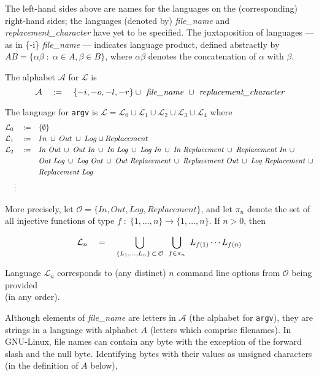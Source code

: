 \documentclass[12pt]{article}
\newcommand{\tab}{\hspace*{2em}}
\newcommand{\mtab}{\hspace*{1em}}
\newcommand{\es}[1] {\begin{equation*}#1\end{equation*}}
\newcommand{\as}[1] {\begin{align*}#1\end{align*}}
\newcommand{\ra}{\rightarrow}
\newcommand{\cdef}{\mtab:=\mtab}
\begin{document}
The left-hand sides above are names for the languages on the (corresponding) right-hand sides; the languages 
(denoted by) \textit{file\_name} and \textit{replacement\_character} have yet to be specified. The juxtaposition
of languages --- as in \{-i\} \textit{file\_name} --- indicates language product, defined abstractly by \\
$ AB = \{\alpha\beta \;:\; \alpha \in A, \beta \in B\} $, where $ \alpha \beta $ 
denotes the concatenation of $ \alpha $ with $ \beta $.

The alphabet $ \mathcal{A} $ for $ \mathcal{L} $ is
\es{ 
    \mathcal{A} \mtab:=\mtab \{-i, -o, -l, -r\} \cup \textit{ file\_name } \cup \textit{ replacement\_character} 
}

The language for \texttt{argv} is 
    $ \mathcal{L} = \mathcal{L}_0 \cup \mathcal{L}_1 \cup \mathcal{L}_2 \cup \mathcal{L}_3 \cup \mathcal{L}_4 $ 
where
\as{
    \mathcal{L}_0 \cdef &\{ \emptyset \} \\
    \mathcal{L}_1 \cdef &In \;\cup\; Out \;\cup\; Log \cup Replacement \\
    \mathcal{L}_2 \cdef &\textit{In Out} \;\cup\; \textit{Out In} \;\cup\; \textit{In Log} \;\cup\; \textit{Log In} \;\cup\; 
                            \textit{In Replacement} \;\cup\; \textit{Replacement In} \;\,\cup \\ 
                        &\textit{Out Log} \;\cup\; \textit{Log Out} \;\cup\; \textit{Out Replacement} \;\cup\; 
                            \textit{Replacement Out} \;\cup\; \textit{Log Replacement} \;\,\cup \\ 
                        &\textit{Replacement Log} \\
    \vdots \tab\mtab&
}

More precisely, let 
    $ \mathcal{O} = \{\textit{In}, \textit{Out}, \textit{Log}, \textit{Replacement}\} $, 
and let $ \pi_n $ denote the set of all injective functions of type 
    $ f \;:\; \{1, \dotsc, n\} \ra \{1, \dotsc, n\} $. If $ n > 0 $, then

\es{
    \mathcal{L}_n \mtab=\mtab 
        \underset{\{ L_1, \dots, L_n\} \,\subset\, \mathcal{O}}{\bigcup} \; \;
        \underset{f \in \pi_n}{\bigcup} \;\; L_{f(1)} \dotsm L_{f(n)} 
}

Language $ \mathcal{L}_n $ corresponds to (any distinct) $ n $ command line options from $ \mathcal{O} $ being provided \\ 
(in any order). \bigskip


Although elements of \textit{file\_name} are letters in $ \mathcal{A} $ (the alphabet for \texttt{argv}), they are 
strings in a language with alphabet $ A $ (letters which comprise filenames). In GNU-Linux, file names can contain 
any byte with the exception of the forward slash and the null byte. Identifying bytes with their values as 
unsigned characters (in the definition of $ A $ below),
\end{document}
